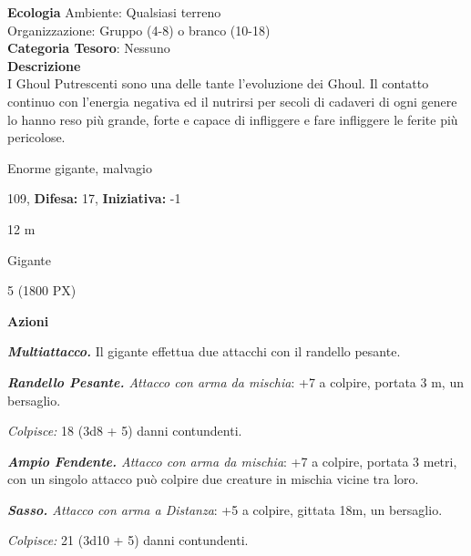 \begin{multicols}{2}
{\textbf{Ecologia}
Ambiente: Qualsiasi terreno\\
Organizzazione: Gruppo (4-8) o branco (10-18)\\
\textbf{Categoria Tesoro}: Nessuno\\
\textbf{Descrizione}\\
I Ghoul Putrescenti sono una delle tante l'evoluzione dei Ghoul. Il contatto continuo con l'energia negativa ed il nutrirsi per secoli di cadaveri di ogni genere lo hanno reso più grande, forte e capace di infliggere e fare infliggere le ferite più pericolose.

\noindent
\begin{description}[noitemsep, topsep=0pt, parsep=0pt, partopsep=0pt, leftmargin=0cm, labelwidth=2.2cm]
	\item[\textbf{Taglia/Tipo:}] Enorme gigante, malvagio
	\item[\textbf{Caratt.:}] 
	\item[\textbf{Punti Ferita:}] 109,  \textbf{Difesa:} 17,  \textbf{Iniziativa:} -1
	\item[\textbf{Movimento:}] 12 m
	\item[\textbf{Tiri Salvez.:}] 
	\item[\textbf{Linguaggi:}] Gigante
	\item[\textbf{Sfida:}] 5 (1800 PX)\smallskip
\end{description}

\textbf{Azioni}

\emph{\textbf{Multiattacco.}} Il gigante effettua due attacchi con il randello pesante.

\emph{\textbf{Randello Pesante.} Attacco con arma da mischia}: +7 a colpire, portata 3 m, un bersaglio.

\emph{Colpisce:} 18 (3d8 + 5) danni contundenti.

\emph{\textbf{Ampio Fendente.} Attacco con arma da mischia}: +7 a colpire, portata 3 metri, con un singolo attacco può colpire due creature in mischia vicine tra loro.

\emph{\textbf{Sasso.} Attacco con arma a Distanza}: +5 a colpire, gittata 18m, un bersaglio.

\emph{Colpisce:} 21 (3d10 + 5) danni contundenti.

}
\end{multicols}
